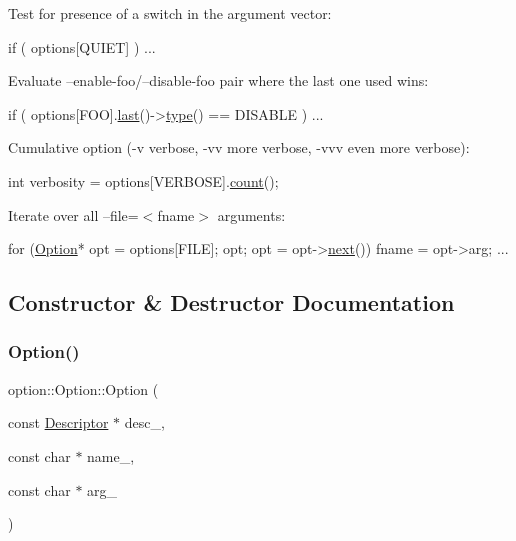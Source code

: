 \begin{DoxyItemize}
\item Test for presence of a switch in the argument vector\+: 
\begin{DoxyCode}
\textcolor{keywordflow}{if} ( options[QUIET] ) ... 
\end{DoxyCode}
 \item Evaluate --enable-\/foo/--disable-\/foo pair where the last one used wins\+: 
\begin{DoxyCode}
\textcolor{keywordflow}{if} ( options[FOO].\hyperlink{classoption_1_1Option_afe2aff68191e55b59c53fac3dbbcd7c3}{last}()->\hyperlink{classoption_1_1Option_a5268a69e1a91137186ab772574296da0}{type}() == DISABLE ) ... 
\end{DoxyCode}
 \item Cumulative option (-\/v verbose, -\/vv more verbose, -\/vvv even more verbose)\+: 
\begin{DoxyCode}
\textcolor{keywordtype}{int} verbosity = options[VERBOSE].\hyperlink{classoption_1_1Option_a8a632dcd89af60fe0806deb756c08f14}{count}(); 
\end{DoxyCode}
 \item Iterate over all --file=$<$fname$>$ arguments\+: 
\begin{DoxyCode}
\textcolor{keywordflow}{for} (\hyperlink{classoption_1_1Option_aa2810152fc23b14175b115d1a7d38095}{Option}* opt = options[FILE]; opt; opt = opt->\hyperlink{classoption_1_1Option_a59ae9aed505f4d410633bb36478a32be}{next}())
 fname = opt->arg; ... 
\end{DoxyCode}
 \end{DoxyItemize}


\subsection{Constructor \& Destructor Documentation}
\mbox{\label{classoption_1_1Option_a385221e2a8f37c548f0d5777bfddb216}} 
\subsubsection{\texorpdfstring{Option()}{Option()}\hspace{0.1cm}{\footnotesize\ttfamily [1/2]}}
{\footnotesize\ttfamily option\+::\+Option\+::\+Option (\begin{DoxyParamCaption}\item[{const \hyperlink{structoption_1_1Descriptor}{Descriptor} $\ast$}]{desc\+\_\+,  }\item[{const char $\ast$}]{name\+\_\+,  }\item[{const char $\ast$}]{arg\+\_\+ }\end{DoxyParamCaption})\hspace{0.3cm}{\ttfamily [inline]}}



